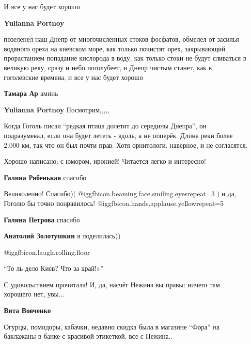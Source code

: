 \begin{itemize}
И все у нас будет хорошо

\begin{itemize} %
\textbf{Yulianna Portnoy} 

позеленел наш Днепр от многочисленных стоков фосфатов, обмелел от засилья
водяного ореха на киевском море, как только почистят орех, закрывающий
прорастанием попадание кислорода в воду, как только стоки не будут сливаться в
великую реку, сразу и небо поголубеет, и Днепр чистым станет, как в гоголевские
времена, и все у нас будет хорошо


\textbf{Тамара Ар} аминь

\textbf{Yulianna Portnoy} Посмотрим,,,,,

\end{itemize} %


Когда Гоголь писал \enquote{редкая птица долетит до середины Днепра}, он подразумевал,
если она будет лететь - вдоль, а не поперёк. Длина реки более 2.000 км, так что
он был почти прав. Хотя орнитологи, наверное, и не согласятся.

Хорошо написано: с юмором, иронией! Читается легко и интересно!

\textbf{Галина Рябенькая} спасибо


Великолепно! Спасибо)) 
@igg{fbicon.beaming.face.smiling.eyes}{repeat=3} ) и да, Гоголю бы точно
понравилось! @igg{fbicon.hands.applause.yellow}{repeat=5} 

\textbf{Галина Петрова} спасибо

\textbf{Анатолий Золотушкин} я поделилась))

 @igg{fbicon.laugh.rolling.floor} 

\enquote{То ль дело Киев? Что за край!»}


С удовольствием прочитала! И, да, насчёт Нежина вы правы: ничего там хорошего
нет, увы...

\begin{itemize} %
\textbf{Вита Вовченко} 

Огурцы, помидоры, кабачки, недавно скидка была в магазине \enquote{Фора} на
баклажаны в банке с красивой этикеткой, все с Нежина..


\end{itemize}
\end{itemize}
